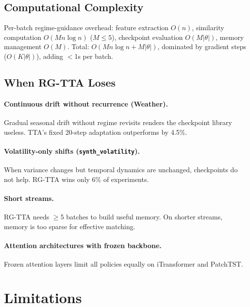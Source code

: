 \documentclass[journal]{IEEEtran}
\begin{document}
\subsection{Computational Complexity}

Per-batch regime-guidance overhead: feature extraction $O(n)$, similarity computation $O(Mn\log n)$ ($M{\leq}5$), checkpoint evaluation $O(M|\theta|)$, memory management $O(M)$. Total: $O(Mn\log n + M|\theta|)$, dominated by gradient steps ($O(K|\theta|)$), adding $<$1s per batch.

\subsection{When RG-TTA Loses}

\paragraph{Continuous drift without recurrence (Weather).} Gradual seasonal drift without regime revisits renders the checkpoint library useless. TTA's fixed 20-step adaptation outperforms by 4.5\%.

\paragraph{Volatility-only shifts (\texttt{synth\_volatility}).} When variance changes but temporal dynamics are unchanged, checkpoints do not help. RG-TTA wins only 6\% of experiments.

\paragraph{Short streams.} RG-TTA needs $\geq$5 batches to build useful memory. On shorter streams, memory is too sparse for effective matching.

\paragraph{Attention architectures with frozen backbone.} Frozen attention layers limit all policies equally on iTransformer and PatchTST.


\section{Limitations}
\label{sec:limitations}
\end{document}

